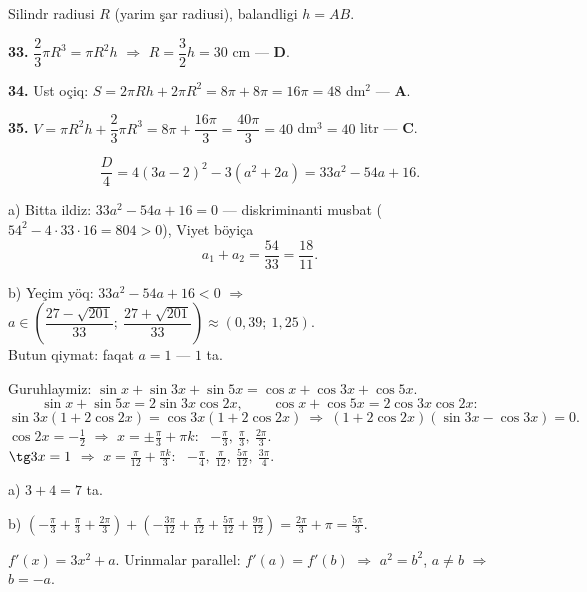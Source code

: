 \newpage
{}
Silindr radiusi $R$ (yarim şar radiusi), balandligi $h=AB$.

\textbf{33.} $\dfrac23\pi R^3=\pi R^2h$ $\Rightarrow$ $R=\dfrac32h=30$ cm — \textbf{D}.

\textbf{34.} Ust oçiq: $S=2\pi Rh+2\pi R^2=8\pi+8\pi=16\pi=48$ dm$^2$ — \textbf{A}.

\textbf{35.} $V=\pi R^2h+\dfrac23\pi R^3=8\pi+\dfrac{16\pi}3=\dfrac{40\pi}3=40$ dm$^3=40$ litr — \textbf{C}.

\newpage
{}
\[\frac D4=4(3a-2)^2-3\left(a^2+2a\right)=33a^2-54a+16.\]

a) Bitta ildiz: $33a^2-54a+16=0$ — diskriminanti musbat ($54^2-4\cdot33\cdot16=804>0$), Viyet böyiça
\[a_1+a_2=\frac{54}{33}=\frac{18}{11}.\]

b) Yeçim yöq: $33a^2-54a+16<0$ $\Rightarrow$ $a\in\left(\dfrac{27-\sqrt{201}}{33};\ \dfrac{27+\sqrt{201}}{33}\right)\approx(0{,}39;\ 1{,}25)$.\\
Butun qiymat: faqat $a=1$ — $1$ ta.

\newpage
{}
Guruhlaymiz: $\sin x+\sin3x+\sin5x=\cos x+\cos3x+\cos5x$.
\[\sin x+\sin5x=2\sin3x\cos2x,\qquad \cos x+\cos5x=2\cos3x\cos2x:\]
\[\sin3x(1+2\cos2x)=\cos3x(1+2\cos2x)\ \Rightarrow\ (1+2\cos2x)(\sin3x-\cos3x)=0.\]
$\cos2x=-\frac12$ $\Rightarrow$ $x=\pm\frac\pi3+\pi k$: \ $-\frac\pi3,\ \frac\pi3,\ \frac{2\pi}3$.\\
$\tg3x=1$ $\Rightarrow$ $x=\frac\pi{12}+\frac{\pi k}3$: \ $-\frac\pi4,\ \frac\pi{12},\ \frac{5\pi}{12},\ \frac{3\pi}4$.

a) $3+4=7$ ta.

b) $\left(-\frac\pi3+\frac\pi3+\frac{2\pi}3\right)+\left(-\frac{3\pi}{12}+\frac\pi{12}+\frac{5\pi}{12}+\frac{9\pi}{12}\right)=\frac{2\pi}3+\pi=\frac{5\pi}3$.

\newpage
{}
$f'(x)=3x^2+a$. Urinmalar parallel: $f'(a)=f'(b)$ $\Rightarrow$ $a^2=b^2$, $a\ne b$ $\Rightarrow$ $b=-a$.

